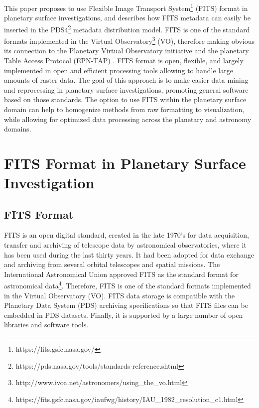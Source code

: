 This paper proposes to use Flexible Image Transport
System\footnote{https://fits.gsfc.nasa.gov/}
(FITS) format \citep{fitsorig,fitsver3} in planetary surface investigations,
and describes how FITS metadata can easily be inserted in the
PDS4\footnote{https://pds.nasa.gov/tools/standards-reference.shtml}
metadata distribution model.
FITS is one of the standard formats implemented in the Virtual
Observatory\footnote{http://www.ivoa.net/astronomers/using\_the\_vo.html}
(VO), therefore making obvious its connection to the Planetary Virtual
Observatory initiative and the planetary Table Access Protocol (EPN-TAP)
\citep{ERARDepntap}.
FITS format is open, flexible, and largely implemented in open and efficient
processing tools allowing to handle large amounts of raster data.
The goal of this approach is to make easier data mining and reprocessing
in planetary surface investigations, promoting general software based on those
standards.
The option to use FITS within the planetary surface domain can help to
homogenize methods from raw formatting to visualization, while
allowing for optimized data processing across the planetary and astronomy domains.

\section{FITS Format in Planetary Surface Investigation}
\label{sec:fitspss}

\subsection{FITS Format}
FITS is an open digital standard, created in the late 1970's for data acquisition,
transfer and archiving of telescope data by astronomical observatories, where
it has been used during the last thirty years.
It had been adopted for data exchange and archiving from several orbital telescopes
and spatial missions.
The International Astronomical Union approved FITS as the standard format
for astronomical data\footnote{https://fits.gsfc.nasa.gov/iaufwg/history/IAU\_1982\_resolution\_c1.html}. 
Therefore, FITS is one of the standard formats implemented in the Virtual
Observatory (VO).
FITS data storage is compatible with the Planetary Data System (PDS)
archiving specifications so that FITS files can be embedded in PDS datasets.
Finally, it is supported by a large number of open libraries
and software tools.

